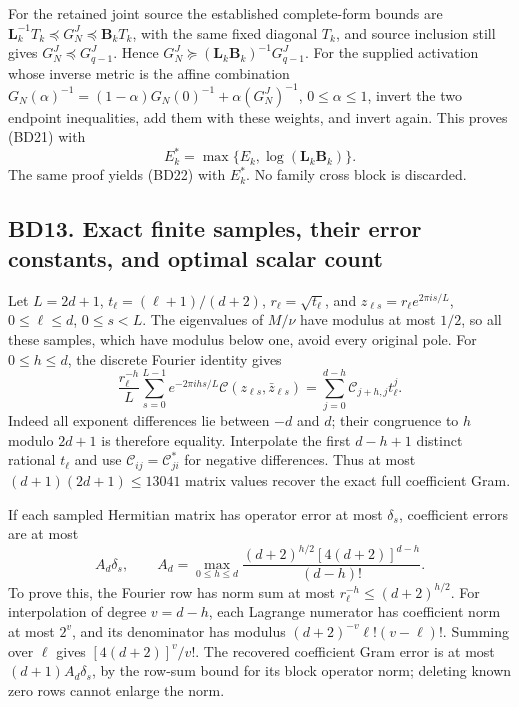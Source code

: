 \documentclass[11pt]{article}
\begin{document}
For the retained joint source the established complete-form bounds are \(\mathbf L_k^{-1}T_k\preceq G_N^J\preceq\mathbf B_kT_k\), with the same fixed diagonal \(T_k\), and source inclusion still gives \(G_N^J\preceq G_{q-1}^J\). Hence \(G_N^J\succeq(\mathbf L_k\mathbf B_k)^{-1}G_{q-1}^J\). For the supplied activation whose inverse metric is the affine combination \(G_N(\alpha)^{-1}=(1-\alpha)G_N(0)^{-1}+\alpha(G_N^J)^{-1}\), \(0\le\alpha\le1\), invert the two endpoint inequalities, add them with these weights, and invert again. This proves (BD21) with \[
E_k^*=\max\{E_k,\log(\mathbf L_k\mathbf B_k)\}.
\] The same proof yields (BD22) with \(E_k^*\). No family cross block is discarded.

\subsection{BD13. Exact finite samples, their error constants, and optimal scalar count}\label{bd13.-exact-finite-samples-their-error-constants-and-optimal-scalar-count}

Let \(L=2d+1\), \(t_\ell=(\ell+1)/(d+2)\), \(r_\ell=\sqrt{t_\ell}\), and \(z_{\ell s}=r_\ell e^{2\pi is/L}\), \(0\le\ell\le d\), \(0\le s<L\). The eigenvalues of \(M/\nu\) have modulus at most \(1/2\), so all these samples, which have modulus below one, avoid every original pole. For \(0\le h\le d\), the discrete Fourier identity gives \[
\frac{r_\ell^{-h}}L\sum_{s=0}^{L-1}e^{-2\pi ihs/L}\mathcal C(z_{\ell s},\bar z_{\ell s})
=\sum_{j=0}^{d-h}\mathcal C_{j+h,j}t_\ell^j. \tag{BD23}
\] Indeed all exponent differences lie between \(-d\) and \(d\); their congruence to \(h\) modulo \(2d+1\) is therefore equality. Interpolate the first \(d-h+1\) distinct rational \(t_\ell\) and use \(\mathcal C_{ij}=\mathcal C_{ji}^*\) for negative differences. Thus at most \((d+1)(2d+1)\le13041\) matrix values recover the exact full coefficient Gram.

If each sampled Hermitian matrix has operator error at most \(\delta_s\), coefficient errors are at most \[
A_d\delta_s,\qquad
A_d=\max_{0\le h\le d}\frac{(d+2)^{h/2}[4(d+2)]^{d-h}}{(d-h)!}.
\] To prove this, the Fourier row has norm sum at most \(r_\ell^{-h}\le(d+2)^{h/2}\). For interpolation of degree \(v=d-h\), each Lagrange numerator has coefficient norm at most \(2^v\), and its denominator has modulus \((d+2)^{-v}\ell!(v-\ell)!\). Summing over \(\ell\) gives \([4(d+2)]^v/v!\). The recovered coefficient Gram error is at most \((d+1)A_d\delta_s\), by the row-sum bound for its block operator norm; deleting known zero rows cannot enlarge the norm.
\end{document}
